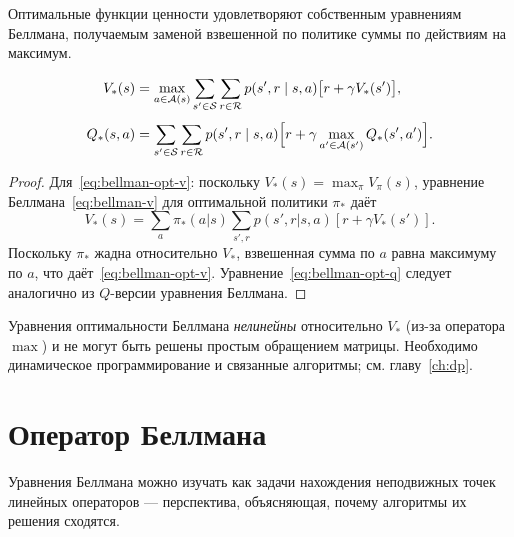 Оптимальные функции ценности удовлетворяют собственным уравнениям Беллмана, получаемым заменой взвешенной по политике суммы по действиям на максимум.

\begin{theorem}
\label{thm:bellman-optimality}
\begin{align}
V_*(s) &= \max_{a \in \mathcal{A}(s)}
           \sum_{s' \in \mathcal{S}} \sum_{r \in \mathcal{R}}
           p(s', r \mid s, a)\bigl[r + \gamma V_*(s')\bigr],
           \label{eq:bellman-opt-v} \\[4pt]
Q_*(s, a) &= \sum_{s' \in \mathcal{S}} \sum_{r \in \mathcal{R}}
             p(s', r \mid s, a)
             \Bigl[r + \gamma \max_{a' \in \mathcal{A}(s')} Q_*(s', a')\Bigr].
             \label{eq:bellman-opt-q}
\end{align}
\end{theorem}

\begin{proof}
Для~\eqref{eq:bellman-opt-v}: поскольку $V_*(s) = \max_\pi V_\pi(s)$, уравнение Беллмана~\eqref{eq:bellman-v} для оптимальной политики $\pi_*$ даёт
\[
V_*(s) = \sum_a \pi_*(a|s) \sum_{s',r} p(s',r|s,a)[r + \gamma V_*(s')].
\]
Поскольку $\pi_*$ жадна относительно $V_*$, взвешенная сумма по $a$ равна максимуму по $a$, что даёт~\eqref{eq:bellman-opt-v}. Уравнение~\eqref{eq:bellman-opt-q} следует аналогично из $Q$-версии уравнения Беллмана.
\end{proof}

\begin{remark}
Уравнения оптимальности Беллмана \emph{нелинейны} относительно $V_*$ (из-за оператора $\max$) и не могут быть решены простым обращением матрицы. Необходимо динамическое программирование и связанные алгоритмы; см. главу~\ref{ch:dp}.
\end{remark}


\section{Оператор Беллмана}
\label{sec:bellman-operator}

Уравнения Беллмана можно изучать как задачи нахождения неподвижных точек линейных операторов — перспектива, объясняющая, почему алгоритмы их решения сходятся.

